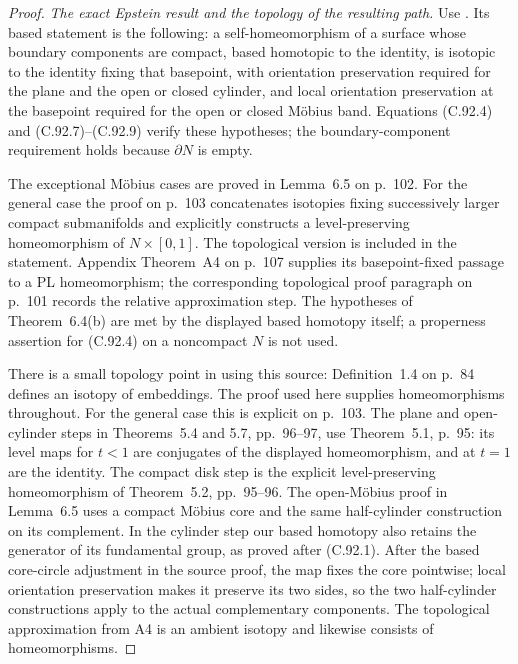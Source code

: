 \begin{proof}
\emph{The exact Epstein result and the topology of the resulting path.}
Use \cite[Theorem~6.4(b), p.~101; proof, pp.~101--103]{C_Epstein1966}.
Its based statement is the following: a self-homeomorphism of a
surface whose boundary components are compact, based homotopic
to the identity, is isotopic to the identity fixing that basepoint,
with orientation preservation required for the plane and the open
or closed cylinder, and local orientation preservation at the
basepoint required for the open or closed M\"obius band.
Equations (C.92.4) and (C.92.7)--(C.92.9) verify these hypotheses;
the boundary-component requirement holds because $\partial N$
is empty.

The exceptional M\"obius cases are proved in Lemma~6.5 on p.~102.
For the general case the proof on p.~103 concatenates isotopies
fixing successively larger compact submanifolds and explicitly
constructs a level-preserving homeomorphism of $N\times[0,1]$.
The topological version is included in the statement. Appendix
Theorem~A4 on p.~107 supplies its basepoint-fixed passage to a
PL homeomorphism; the corresponding topological proof paragraph
on p.~101 records the relative approximation step.
The hypotheses of Theorem~6.4(b) are met by the displayed
based homotopy itself; a properness assertion for (C.92.4)
on a noncompact $N$ is not used.

There is a small topology point in using this source:
Definition~1.4 on p.~84 defines an isotopy of embeddings.
The proof used here supplies homeomorphisms throughout.
For the general case this is explicit on p.~103.
The plane and open-cylinder steps in Theorems~5.4 and 5.7,
pp.~96--97, use Theorem~5.1, p.~95: its level maps for
$t<1$ are conjugates of the displayed homeomorphism, and
at $t=1$ are the identity. The compact disk step is the
explicit level-preserving homeomorphism of Theorem~5.2,
pp.~95--96. The open-M\"obius proof in Lemma~6.5 uses a
compact M\"obius core and the same half-cylinder construction
on its complement. In the cylinder step our based homotopy
also retains the generator of its fundamental group, as
proved after (C.92.1). After the based core-circle adjustment
in the source proof, the map fixes the core pointwise;
local orientation preservation makes it preserve its two
sides, so the two half-cylinder constructions apply to
the actual complementary components.
The topological approximation from A4 is an ambient
isotopy and likewise consists of homeomorphisms.


\end{proof}
